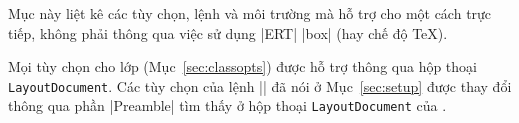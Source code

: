 Mục này liệt kê các tùy chọn, lệnh và môi trường mà 
hỗ trợ cho \LyX{} một cách trực tiếp, không phải thông qua việc sử dụng
|ERT| |box| (hay chế độ \TeX).

Mọi tùy chọn cho lớp (Mục~\vref{sec:classopts}) được hỗ trợ thông
qua hộp thoại \texttt{Layout\LyXarrow Document}. Các tùy chọn của lệnh |\pdsetup|
đã nói ở Mục~\vref{sec:setup} được thay đổi thông qua phần |Preamble|
tìm thấy ở hộp thoại \texttt{Layout\LyXarrow Document} của \LyX.

